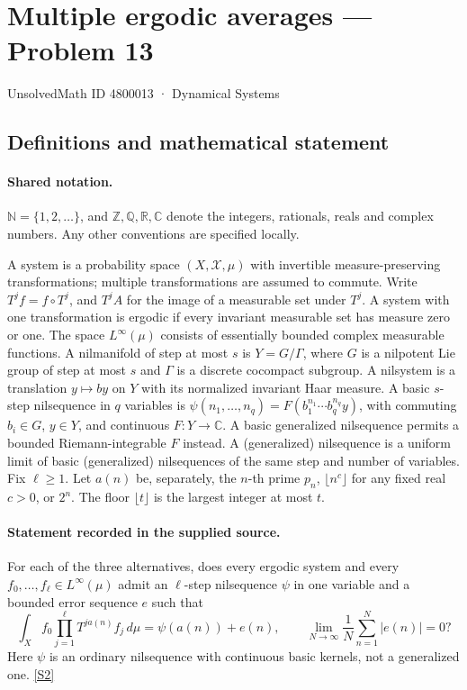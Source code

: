 \documentclass[11pt]{article}
\newcommand{\sref}[2]{\hyperlink{source:#1:#2}{[S#2]}}
\begin{document}
\setcounter{section}{4800012}
\section{Multiple ergodic averages — Problem 13}\label{4800013}
{\small\sffamily UnsolvedMath ID 4800013 · Dynamical Systems}
\subsection{Definitions and mathematical statement}

\paragraph{Shared notation.}$\mathbb N=\{1,2,\ldots\}$, and $\mathbb Z,\mathbb Q,\mathbb R,\mathbb C$ denote the integers, rationals, reals and complex numbers. Any other conventions are specified locally.


A system is a probability space $(X,\mathcal X,\mu)$ with invertible measure-preserving transformations; multiple transformations are assumed to commute. Write $T^j f=f\circ T^j$, and $T^j A$ for the image of a measurable set under $T^j$. A system with one transformation is ergodic if every invariant measurable set has measure zero or one. The space $L^\infty(\mu)$ consists of essentially bounded complex measurable functions. A nilmanifold of step at most $s$ is $Y=G/\Gamma$, where $G$ is a nilpotent Lie group of step at most $s$ and $\Gamma$ is a discrete cocompact subgroup. A nilsystem is a translation $y\mapsto by$ on $Y$ with its normalized invariant Haar measure. A basic $s$-step nilsequence in $q$ variables is $\psi(n_1,\ldots,n_q)=F(b_1^{n_1}\cdots b_q^{n_q}y)$, with commuting $b_i\in G$, $y\in Y$, and continuous $F:Y\to\mathbb C$. A basic generalized nilsequence permits a bounded Riemann-integrable $F$ instead. A (generalized) nilsequence is a uniform limit of basic (generalized) nilsequences of the same step and number of variables. Fix $\ell\ge1$. Let $a(n)$ be, separately, the $n$-th prime $p_n$, $\lfloor n^c\rfloor$ for any fixed real $c>0$, or $2^n$. The floor $\lfloor t\rfloor$ is the largest integer at most $t$.
\paragraph{Statement recorded in the supplied source.}
For each of the three alternatives, does every ergodic system and every $f_0,\ldots,f_\ell\in L^\infty(\mu)$ admit an $\ell$-step nilsequence $\psi$ in one variable and a bounded error sequence $e$ such that \[\int_X f_0\prod_{j=1}^\ell T^{ja(n)}f_j\,d\mu=\psi(a(n))+e(n),\qquad \lim_{N\to\infty}\frac1N\sum_{n=1}^N|e(n)|=0?\] Here $\psi$ is an ordinary nilsequence with continuous basic kernels, not a generalized one. \sref{4800013}{2}
\end{document}
